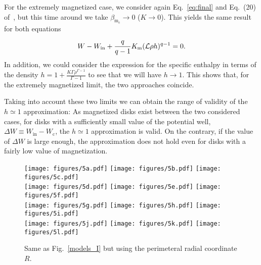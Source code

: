 \documentclass[twocolumn,aps,showpacs,showkeys,prd,superscriptaddress,byrevtex, amsmath]{revtex4-1}
\begin{document}
For the extremely magnetized case, we consider again Eq.~\eqref{eq:final} and Eq.~(20) of~\cite{Gimeno-Soler:2017}, but this time around we take $\beta_{\mathrm{m_c}} \rightarrow 0$ ($K \rightarrow 0$). This yields the same result for both equations

\begin{equation}
W - W_{\mathrm{in}} + \frac{q}{q-1}K_{\rm m}(\mathcal{L}\rho h)^{q-1}=0.
\end{equation}
In addition, we could consider the expression for the specific enthalpy in terms of the density $h = 1 + \frac{K\Gamma\rho^{\Gamma-1}}{\Gamma - 1}$ to 
see that we will have $h \rightarrow 1$. This shows that, for the extremely magnetized limit, the two approaches coincide.

Taking into account these two limits we can obtain the range of validity of the $h \simeq 1$ approximation: As magnetized disks exist between the two considered cases, for disks with a sufficiently small value of the potential well, $\Delta W \equiv W_{\mathrm{in}} - W_{\mathrm{c}}$, the $h \simeq 1$ approximation is valid. On the contrary, if the value of $\Delta W$ is large enough, the approximation does not hold even for disks with a fairly low value of magnetization.

\begin{figure*}
\centering
\texttt{[image: figures/5a.pdf]}
\hspace{-0.3cm}
\texttt{[image: figures/5b.pdf]}
\hspace{-0.2cm}
\texttt{[image: figures/5c.pdf]}
\\
\texttt{[image: figures/5d.pdf]}
\hspace{-0.3cm}
\texttt{[image: figures/5e.pdf]}
\hspace{-0.2cm}
\texttt{[image: figures/5f.pdf]}
\\
\texttt{[image: figures/5g.pdf]}
\hspace{-0.3cm}
\texttt{[image: figures/5h.pdf]}
\hspace{-0.2cm}
\texttt{[image: figures/5i.pdf]}
\\
\texttt{[image: figures/5j.pdf]}
\hspace{-0.3cm}
\texttt{[image: figures/5k.pdf]}
\hspace{-0.2cm}
\texttt{[image: figures/5l.pdf]}
\hspace{-0.2cm}
\caption{Same as Fig.~\ref{models_I} but using the perimeteral radial coordinate $R$.}
\label{models_peri_I}
\end{figure*}
\end{document}
